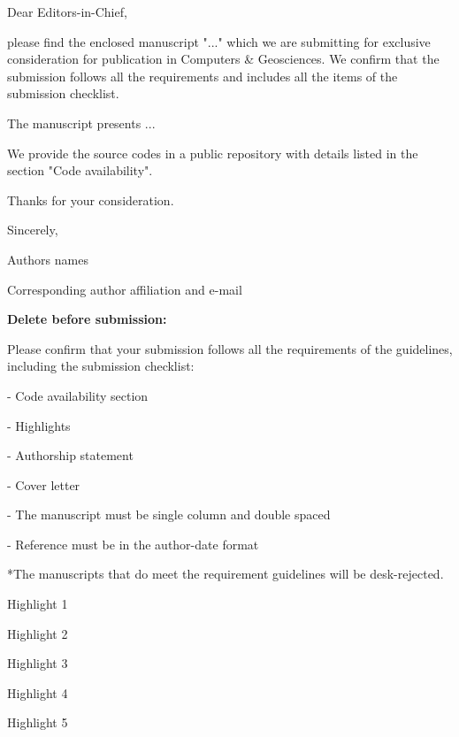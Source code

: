 \documentclass[a4paper,fleqn]{cas-sc}
\begin{document}
\begin{coverletter}

Dear Editors-in-Chief,
\newline
 
please find the enclosed manuscript "..." which we are submitting for exclusive consideration for publication in Computers \& Geosciences. We confirm that the submission follows all the requirements and includes all the items of the submission checklist.  
\newline
 
The manuscript presents ... 
\newline

We provide the source codes in a public repository with details listed in the section "Code availability".
\newline

Thanks for your consideration. 
\newline

Sincerely,
\newline

Authors names

Corresponding author affiliation and e-mail
\newline

\textbf{Delete before submission:}

Please confirm that your submission follows all the requirements of the guidelines, including the submission checklist:

- Code availability section 

- Highlights

- Authorship statement

- Cover letter

- The manuscript must be single column and double spaced

- Reference must be in the author-date format

*The manuscripts that do meet the requirement guidelines will be desk-rejected.



\end{coverletter}

 
\begin{highlights}
\item Highlight 1
\item Highlight 2
\item Highlight 3
\item Highlight 4
\item Highlight 5
\end{highlights}
\end{document}
